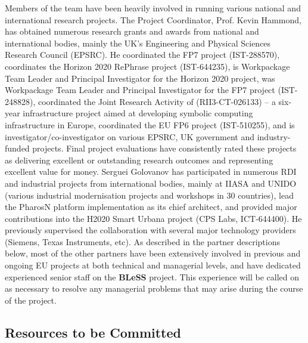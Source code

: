 \documentclass[a4paper,11pt]{article}
\newcommand{\project}[1]{\textbf{#1}\xspace}
\newcommand{\BLESS}{\project{BLeSS}}
\newcommand{\TheProject}{\BLESS}
\begin{document}
Members of the team have been heavily involved in running
various national and international research projects.  The
Project Coordinator, Prof. Kevin Hammond, has obtained numerous
research grants and awards from national and international
bodies, mainly the UK's Engineering and Physical Sciences
Research Council (EPSRC). He coordinated the FP7 \paraphrase{} project (IST-288570),
coordinates the Horizon 2020 RePhrase project (IST-644235),
is  Workpackage Team Leader and Principal Investigator for the Horizon 2020 \teamplay{} project, %
was Workpackage Team Leader and Principal Investigator for the FP7 \advanceproject{} project (IST-248828),
coordinated the Joint
Research Activity of \science{} (RII3-CT-026133) -- a six-year
infrastructure project aimed at developing symbolic computing
infrastructure in Europe, coordinated the EU FP6
\embounded{} project (IST-510255),
and is investigator/co-investigator on various EPSRC, UK government and industry-funded projects.
Final project evaluations have consistently rated these projects as
delivering excellent or outstanding research outcomes and
representing excellent value for money.
%
Serguei Golovanov has participated in numerous RDI and industrial
projects from international bodies, mainly at IIASA and UNIDO (various
industrial modernisation projects and workshops in 30 countries), lead
the PharosN platform implementation as its chief architect, and provided
major contributions into the H2020 {Smart Urbana} project (CPS Labs, ICT-644400). He previously supervised the \GOLEMshort{} collaboration with several
major technology providers (Siemens, Texas Instruments, etc).
%
As described in the partner descriptions below,
most of the other partners have been extensively involved in previous and
ongoing EU projects at both technical and managerial
levels, and have dedicated experienced senior staff on the \TheProject{} project.
%
This experience will be called on as necessary to resolve any
managerial problems that may arise during the course of the
project.


\subsection{Resources to be Committed}

\end{document}
